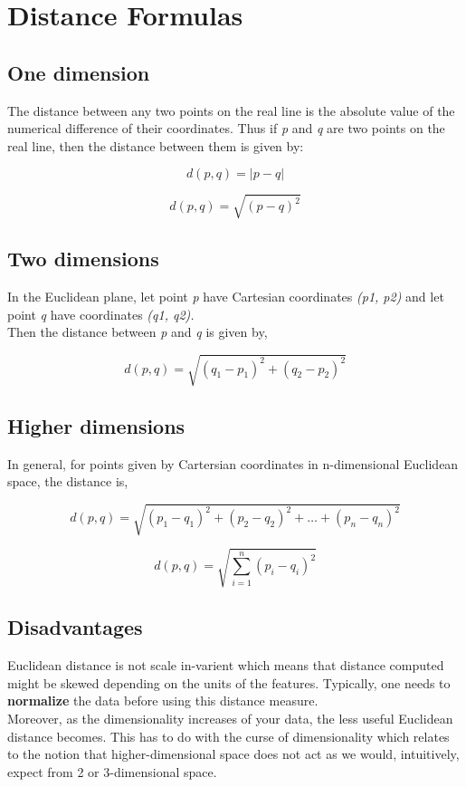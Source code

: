 \documentclass[11pt]{article}
\begin{document}
\section{Distance Formulas}
\label{sec:orgdd8eacf}
\subsection{One dimension}
\label{sec:orgb17cd84}
The distance between any two points on the real line is the absolute
value of the numerical difference of their coordinates. Thus if \emph{p} and
\emph{q} are two points on the real line, then the distance between them is
given by:

$$
d(p, q) = |p -q|
$$

$$
d(p, q) = \sqrt{(p-q)^2}
$$

\subsection{Two dimensions}
\label{sec:org8b32e7e}
In the Euclidean plane, let point \emph{p} have Cartesian coordinates \emph{(p1,
p2)} and let point \emph{q} have coordinates \emph{(q1, q2).}\\
Then the distance between \emph{p} and \emph{q} is given by,

$$
d(p, q) = \sqrt{(q_1-p_1)^2+(q_2-p_2)^2}
$$

\subsection{Higher dimensions}
\label{sec:org4630d53}
In general, for points given by Cartersian coordinates in n-dimensional
Euclidean space, the distance is,

$$
d(p,q) = \sqrt{(p_1-q_1)^2+(p_2-q_2)^2+\dots+(p_n-q_n)^2}
$$

$$
d(p, q) = \sqrt{\sum_{i=1}^n(p_i-q_i)^2}
$$

\subsection{Disadvantages}
\label{sec:orgef9df2a}
Euclidean distance is not scale in-varient which means that distance
computed might be skewed depending on the units of the features.
Typically, one needs to \textbf{normalize} the data before using this distance
measure.\\
Moreover, as the dimensionality increases of your data, the less useful
Euclidean distance becomes. This has to do with the curse of
dimensionality which relates to the notion that higher-dimensional space
does not act as we would, intuitively, expect from 2 or 3-dimensional
space.
\end{document}
